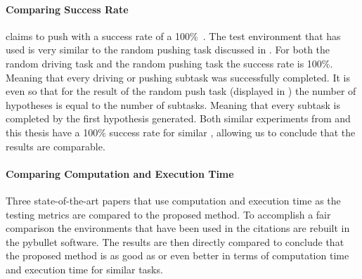 \begin{table}[H]
\begin{tabular}
  \end{tabular}
  \caption{Overview of recent state-of-the-art papers that include a subset of the 3 topics (learning system models, \ac{NAMO}, and nonprehensile pushing). The \textit{grasp-push} and \textit{grasp-pull} refer to prehensile push and pull manipulation, \textit{gripped} refers to fully gripping and lifting objects for manipulation, \textit{pushing} refers to nonprehensile push manipulation. The test metric indicates the testing method used by the paper, where the underlined metric is used to compare against the proposed method.}%
\label{table:sota_vs_results_proposed method}
\end{table}

\paragraph{Comparing Success Rate}
\citeauthor{ellis_navigation_2022} claims to push with a success rate of a 100\%~\cite{ellis_navigation_2022}. The test environment that \citeauthor{ellis_navigation_2022} has used is very similar to the random pushing task discussed in . For both the random driving task and the random pushing task the success rate is 100\%. Meaning that every driving or pushing subtask was successfully completed. It is even so that for the result of the random push task (displayed in ) the number of hypotheses is equal to the number of subtasks. Meaning that every subtask is completed by the first hypothesis generated. Both similar experiments from \citeauthor{ellis_navigation_2022} and this thesis have a 100\% success rate for similar 
, allowing us to conclude that the results are comparable.

\paragraph{Comparing Computation and Execution Time}
Three state-of-the-art papers that use computation and execution time as the testing metrics are compared to the proposed method. To accomplish a fair comparison the environments that have been used in the citations are rebuilt in the pybullet software. The results are then directly compared to conclude that the proposed method is as good as or even better in terms of computation time and execution time for similar tasks.\bs

